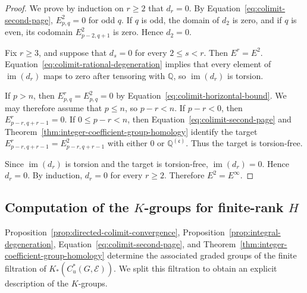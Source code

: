 \documentclass[pdflatex,sn-mathphys-num]{sn-jnl}%
\theoremstyle{plain}
\theoremstyle{remark}
\theoremstyle{definition}
\numberwithin{equation}{section}
\begin{document}
\begin{proof}
We prove by induction on \( r\geq2 \) that \( d_r=0 \). By Equation~\eqref{eq:colimit-second-page}, \( E^2_{p,q}=0 \) for odd \( q \). If \( q \) is odd, the domain of \( d_2 \) is zero, and if \( q \) is even, its codomain \( E^2_{p-2,q+1} \) is zero. Hence \( d_2=0 \).

Fix \( r\geq3 \), and suppose that \( d_s=0 \) for every \( 2\leq s<r \). Then \( E^r=E^2 \). Equation~\eqref{eq:colimit-rational-degeneration} implies that every element of \( \operatorname{im}(d_r) \) maps to zero after tensoring with \( \mathbb Q \), so \( \operatorname{im}(d_r) \) is torsion.

If \( p>n \), then \( E^r_{p,q}=E^2_{p,q}=0 \) by Equation~\eqref{eq:colimit-horizontal-bound}. We may therefore assume that \( p\leq n \), so \( p-r<n \). If \( p-r<0 \), then \( E^r_{p-r,q+r-1}=0 \). If \( 0\leq p-r<n \), then Equation~\eqref{eq:colimit-second-page} and Theorem~\ref{thm:integer-coefficient-group-homology} identify the target \( E^r_{p-r,q+r-1}=E^2_{p-r,q+r-1} \) with either \( 0 \) or \( \mathbb Q^{(\mathfrak c)} \). Thus the target is torsion-free.

Since \( \operatorname{im}(d_r) \) is torsion and the target is torsion-free, \( \operatorname{im}(d_r)=0 \). Hence \( d_r=0 \). By induction, \( d_r=0 \) for every \( r\geq2 \). Therefore \( E^2=E^\infty \).
\end{proof}

\subsection[\texorpdfstring{Computation of the \( K \)-groups for finite-rank \( H \)}{Computation of the K-groups for finite-rank H}]{Computation of the \( K \)-groups for finite-rank \( H \)}
\label{sec:finite-rank-computation}

Proposition~\ref{prop:directed-colimit-convergence}, Proposition~\ref{prop:integral-degeneration}, Equation~\eqref{eq:colimit-second-page}, and Theorem~\ref{thm:integer-coefficient-group-homology} determine the associated graded groups of the finite filtration of \( K_*(C_u^*(G,\mathcal E)) \). We split this filtration to obtain an explicit description of the \( K \)-groups.
\end{document}
